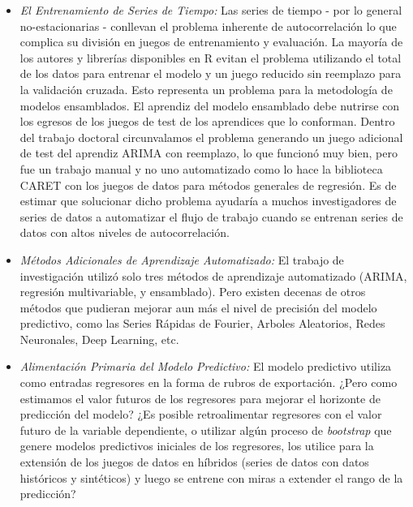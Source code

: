\begin{itemize}
    \item \emph{El Entrenamiento de Series de Tiempo:} Las series de tiempo - por lo general no-estacionarias - conllevan el problema inherente de autocorrelación lo que complica su división en juegos de entrenamiento y evaluación. La mayoría de los autores y librerías disponibles en R evitan el problema utilizando el total de los datos para entrenar el modelo y un juego reducido sin reemplazo para la validación cruzada. Esto representa un problema para la metodología de modelos ensamblados. El aprendiz del modelo ensamblado debe nutrirse con los egresos de los juegos de test de los aprendices que lo conforman. Dentro del trabajo doctoral circunvalamos el problema generando un juego adicional de test del aprendiz ARIMA con reemplazo, lo que funcionó muy bien, pero fue un trabajo manual y no uno automatizado como lo hace la biblioteca CARET con los juegos de datos para métodos generales de regresión. Es de estimar que solucionar dicho problema ayudaría a muchos investigadores de series de datos a automatizar el flujo de trabajo cuando se entrenan series de datos con altos niveles de autocorrelación. \item \emph{Métodos Adicionales de Aprendizaje Automatizado:} El trabajo de investigación utilizó solo tres métodos de aprendizaje automatizado (ARIMA, regresión multivariable, y ensamblado). Pero existen decenas de otros métodos que pudieran mejorar aun más el nivel de precisión del modelo predictivo, como las Series Rápidas de Fourier, Arboles Aleatorios, Redes Neuronales, Deep Learning, etc. 
    \item \emph{Alimentación Primaria del Modelo Predictivo:} El modelo predictivo utiliza como entradas regresores en la forma de rubros de exportación. ¿Pero como estimamos el valor futuros de los regresores para mejorar el horizonte de predicción del modelo? ¿Es posible retroalimentar regresores con el valor futuro de la variable dependiente, o utilizar algún proceso de \emph{bootstrap} que genere modelos predictivos iniciales de los regresores, los utilice para la extensión de los juegos de datos en híbridos (series de datos con datos históricos y sintéticos) y luego se entrene con miras a extender el rango de la predicción?
\end{itemize}